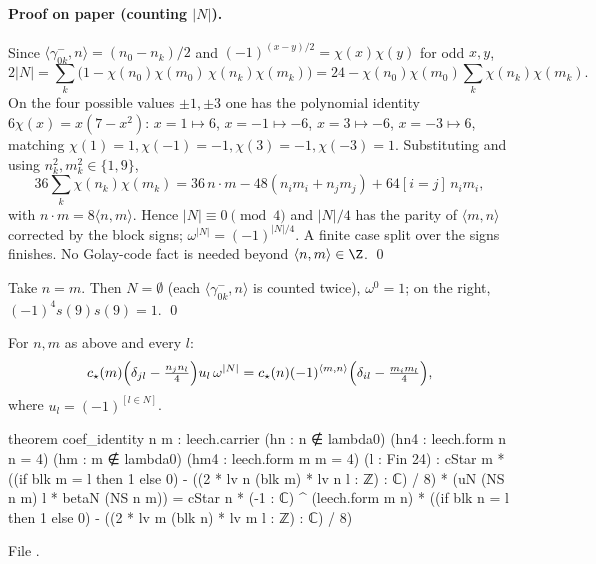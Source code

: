 \paragraph{Proof on paper (counting $|N|$).}  Since $\langle\gamma^-_{0k},n\rangle=(n_0-n_k)/2$ and
$(-1)^{(x-y)/2}=\chi(x)\chi(y)$ for odd $x,y$,
\begin{equation*}
 2|N|=\sum_{k}\bigl(1-\chi(n_0)\chi(m_0)\,\chi(n_k)\chi(m_k)\bigr)=24-\chi(n_0)\chi(m_0)\sum_k\chi(n_k)\chi(m_k).
\end{equation*}
On the four possible values $\pm1,\pm3$ one has the polynomial identity $6\chi(x)=x(7-x^2)$:
$x=1\mapsto6$, $x=-1\mapsto-6$, $x=3\mapsto-6$, $x=-3\mapsto6$, matching $\chi(1)=1,\chi(-1)=-1,\chi(3)=-1,\chi(-3)=1$.
Substituting and using $n_k^2,m_k^2\in\{1,9\}$,
\begin{equation*}
 36\sum_k\chi(n_k)\chi(m_k)=36\,n\cdot m-48(n_im_i+n_jm_j)+64[i=j]\,n_im_i,
\end{equation*}
with $n\cdot m=8\langle n,m\rangle$.  Hence $|N|\equiv0\pmod4$ and $|N|/4$ has the parity of $\langle m,n\rangle$
corrected by the block signs; $\omega^{|N|}=(-1)^{|N|/4}$.  A finite case split over the signs finishes.
No Golay-code fact is needed beyond $\langle n,m\rangle\in\Z$. \qed

\begin{example}
Take $n=m$.  Then $N=\emptyset$ (each $\langle\gamma^-_{0k},n\rangle$ is counted twice), $\omega^0=1$; on the right,
$(-1)^{4}s(9)s(9)=1$. \qed
\end{example}

\begin{theorem}\label{ch14:thm:coef}
For $n,m$ as above and every $l$:
\begin{equation*}
 c_\star(m)\Bigl(\delta_{jl}-\tfrac{n_jn_l}{4}\Bigr)u_l\,\omega^{|N|}
 =c_\star(n)(-1)^{\langle m,n\rangle}\Bigl(\delta_{il}-\tfrac{m_im_l}{4}\Bigr),
\end{equation*}
where $u_l=(-1)^{[l\in N]}$.
\end{theorem}
\begin{leancode}
theorem coef_identity {n m : leech.carrier} (hn : n ∉ lambda0) (hn4 : leech.form n n = 4)
    (hm : m ∉ lambda0) (hm4 : leech.form m m = 4) (l : Fin 24) :
    cStar m * ((if blk m = l then 1 else 0) - ((2 * lv n (blk m) * lv n l : ℤ) : ℂ) / 8)
        * (uN (NS n m) l * betaN (NS n m))
      = cStar n * (-1 : ℂ) ^ (leech.form m n)
        * ((if blk n = l then 1 else 0) - ((2 * lv m (blk n) * lv m l : ℤ) : ℂ) / 8)
\end{leancode}
File .

